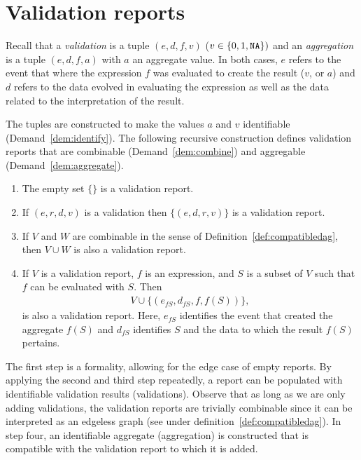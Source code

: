 \section{Validation reports}
\label{sect:basicreports}
Recall that a \emph{validation} is a tuple $(e,d,f,v)$ ($v\in\{0,1,{\normalfont \texttt{NA}}{}\})$
and an \emph{aggregation} is a tuple $(e,d,f,a)$ with $a$ an aggregate value.
In both cases, $e$ refers to the event that where the expression $f$ was
evaluated to create the result ($v$, or $a$) and $d$ refers to the data evolved
in evaluating the expression as well as the data related to the interpretation
of the result. 

The tuples are constructed to make  the values $a$ and $v$ identifiable
(Demand~\ref{dem:identify}).  The following recursive construction defines
validation reports that are combinable (Demand~\ref{dem:combine}) and
aggregable (Demand~\ref{dem:aggregate}).
%
\begin{definition}\leavevmode
\begin{enumerate}[topsep=0pt,itemsep=0pt]
\item The empty set $\{\}$ is a validation report.
\item If $(e,r,d,v)$ is a  validation then $\{(e,d,r,v)\}$ is a validation report.
\item If $V$ and $W$ are combinable in the sense of
Definition~\ref{def:compatibledag}, then $V\cup W$ is also a validation report.
\item If $V$ is a validation report, $f$ is an expression, and  $S$ is a subset of $V$  
such that $f$ can be evaluated with $S$. Then 
\begin{align*}
V\cup \{(e_{fS}, d_{fS}, f, f(S))\},
\end{align*}
is also a validation report. Here, $e_{fS}$ identifies the event that created
the aggregate $f(S)$ and $d_{fS}$ identifies $S$ and the data to which the
result $f(S)$ pertains.
\end{enumerate}
\label{def:basicvalidationreport}
\end{definition}
%
The first step is a formality, allowing for the edge case of empty reports.  By
applying the second and third step repeatedly, a report can be populated with
identifiable validation results (validations). Observe that as long as we are
only adding validations, the validation reports are trivially combinable
since it can be interpreted as an edgeless graph (see under
definition~\ref{def:compatibledag}). In step four, an identifiable aggregate
(aggregation) is constructed that is compatible with the validation report to
which it is added.

